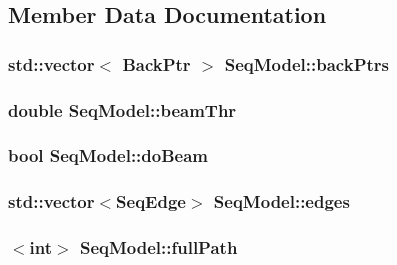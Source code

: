 \subsection{Member Data Documentation}
\hypertarget{class_seq_model_ac6d529a3e49a26fae3566695d235d333}{
\subsubsection[{back\+Ptrs}]{\setlength{\rightskip}{0pt plus 5cm}std\+::vector$<$ {\bf Back\+Ptr} $>$ Seq\+Model\+::back\+Ptrs\hspace{0.3cm}{\ttfamily [private]}}}\label{class_seq_model_ac6d529a3e49a26fae3566695d235d333}
\hypertarget{class_seq_model_a11a6ea74af16863e3bf7c8c967de281f}{
\subsubsection[{beam\+Thr}]{\setlength{\rightskip}{0pt plus 5cm}double Seq\+Model\+::beam\+Thr\hspace{0.3cm}{\ttfamily [private]}}}\label{class_seq_model_a11a6ea74af16863e3bf7c8c967de281f}
\hypertarget{class_seq_model_a0a5eba8ce2a6eccc2a595816813538fc}{
\subsubsection[{do\+Beam}]{\setlength{\rightskip}{0pt plus 5cm}bool Seq\+Model\+::do\+Beam\hspace{0.3cm}{\ttfamily [private]}}}\label{class_seq_model_a0a5eba8ce2a6eccc2a595816813538fc}
\hypertarget{class_seq_model_ab293b1600e51e35d49bc33a45f74dd9d}{
\subsubsection[{edges}]{\setlength{\rightskip}{0pt plus 5cm}std\+::vector$<${\bf Seq\+Edge}$>$ Seq\+Model\+::edges\hspace{0.3cm}{\ttfamily [private]}}}\label{class_seq_model_ab293b1600e51e35d49bc33a45f74dd9d}
\hypertarget{class_seq_model_aa67e8940bd4deb4174dcb8037263b385}{
\subsubsection[{full\+Path}]{$<$int$>$ Seq\+Model\+::full\+Path\hspace{0.3cm}{\ttfamily [private]}}}\label{class_seq_model_aa67e8940bd4deb4174dcb8037263b385}
